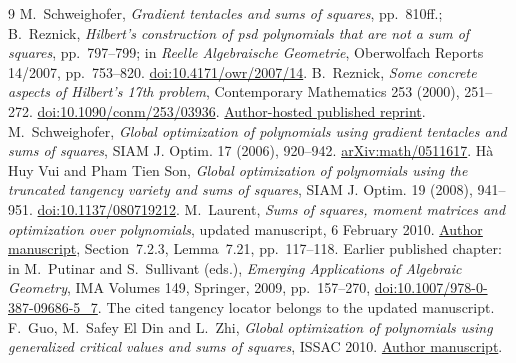 \documentclass[11pt]{article}
\begin{document}
\begin{thebibliography}{9}
M.~Schweighofer, \emph{Gradient tentacles and sums of squares}, pp.~810ff.;
B.~Reznick, \emph{Hilbert's construction of psd polynomials that are not a sum
of squares}, pp.~797--799; in \emph{Reelle Algebraische Geometrie},
Oberwolfach Reports 14/2007, pp.~753--820.
\href{https://doi.org/10.4171/owr/2007/14}{doi:10.4171/owr/2007/14}.
B.~Reznick, \emph{Some concrete aspects of Hilbert's 17th problem},
Contemporary Mathematics 253 (2000), 251--272.
\href{https://doi.org/10.1090/conm/253/03936}{doi:10.1090/conm/253/03936}.
\href{https://reznick.web.illinois.edu/Paper34.pdf}{Author-hosted published reprint}.
M.~Schweighofer, \emph{Global optimization of polynomials using gradient
tentacles and sums of squares}, SIAM J. Optim. 17 (2006), 920--942.
\href{https://arxiv.org/abs/math/0511617}{arXiv:math/0511617}.
H\`a Huy Vui and Pham Tien Son, \emph{Global optimization of polynomials using
the truncated tangency variety and sums of squares}, SIAM J. Optim. 19 (2008),
941--951. \href{https://doi.org/10.1137/080719212}{doi:10.1137/080719212}.
M.~Laurent, \emph{Sums of squares, moment matrices and optimization over
polynomials}, updated manuscript, 6 February 2010.
\href{https://homepages.cwi.nl/~monique/files/moment-ima-update-new.pdf}{Author manuscript}, Section~7.2.3, Lemma~7.21, pp.~117--118.
Earlier published chapter: in M.~Putinar and S.~Sullivant (eds.),
\emph{Emerging Applications of Algebraic Geometry}, IMA Volumes 149,
Springer, 2009, pp.~157--270,
\href{https://doi.org/10.1007/978-0-387-09686-5_7}{doi:10.1007/978-0-387-09686-5\_7}.
The cited tangency locator belongs to the updated manuscript.
F.~Guo, M.~Safey El Din and L.~Zhi, \emph{Global optimization of polynomials
using generalized critical values and sums of squares}, ISSAC 2010.
\href{https://perso.lip6.fr/Mohab.Safey/Articles/gcv_sos.pdf}{Author manuscript}.
\end{thebibliography}
\end{document}
